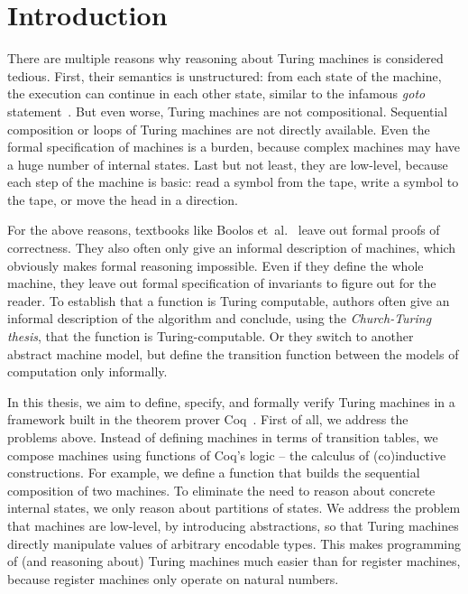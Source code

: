 \chapter{Introduction}
\label{chap:intro}


There are multiple reasons why reasoning about Turing machines is considered tedious.  First, their semantics is unstructured: from each state of the
machine, the execution can continue in each other state, similar to the infamous \textit{goto} statement~\cite{dijkstra2002go}.  But even worse,
Turing machines are not compositional.  Sequential composition or loops of Turing machines are not directly available.  Even the formal specification
of machines is a burden, because complex machines may have a huge number of internal states.  Last but not least, they are low-level, because each
step of the machine is basic: read a symbol from the tape, write a symbol to the tape, or move the head in a direction.

For the above reasons, textbooks like Boolos et~al.~\cite{boolos2007computability} leave out formal proofs of correctness.  They also often only give
an informal description of machines, which obviously makes formal reasoning impossible.  Even if they define the whole machine, they leave out formal
specification of invariants to figure out for the reader.  To establish that a function is Turing computable, authors often give an informal
description of the algorithm and conclude, using the \textit{Church-Turing thesis}, that the function is Turing-computable. Or they switch to another
abstract machine model, but define the transition function between the models of computation only informally.

In this thesis, we aim to define, specify, and formally verify Turing machines in a framework built in the theorem prover Coq~\cite{Coq}.  First of
all, we address the problems above.  Instead of defining machines in terms of transition tables, we compose machines using functions of Coq's logic --
the calculus of (co)inductive constructions.  For example, we define a function that builds the sequential composition of two machines.  To eliminate
the need to reason about concrete internal states, we only reason about partitions of states.  We address the problem that machines are low-level, by
introducing abstractions, so that Turing machines directly manipulate values of arbitrary encodable types.  This makes programming of (and reasoning
about) Turing machines much easier than for register machines, because register machines only operate on natural numbers.


